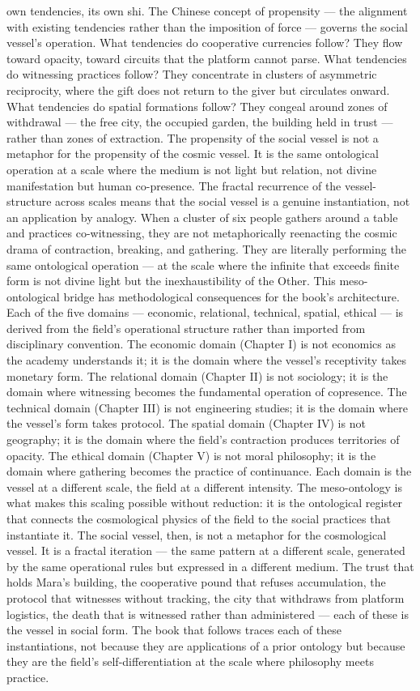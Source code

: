 own tendencies, its own shi. The Chinese concept of propensity — the alignment with existing tendencies rather than the imposition of force — governs the social vessel’s operation. What tendencies do cooperative currencies follow? They flow toward opacity, toward circuits that the platform cannot parse. What tendencies do witnessing practices follow? They concentrate in clusters of asymmetric reciprocity, where the gift does not return to the giver but circulates onward. What tendencies do spatial formations follow? They congeal around zones of withdrawal — the free city, the occupied garden, the building held in trust — rather than zones of extraction. The propensity of the social vessel is not a metaphor for the propensity of the cosmic vessel. It is the same ontological operation at a scale where the medium is not light but relation, not divine manifestation but human co-presence. The fractal recurrence of the vessel-structure across scales means that the social vessel is a genuine instantiation, not an application by analogy. When a cluster of six people gathers around a table and practices co-witnessing, they are not metaphorically reenacting the cosmic drama of contraction, breaking, and gathering. They are literally performing the same ontological operation — at the scale where the infinite that exceeds finite form is not divine light but the inexhaustibility of the Other. This meso-ontological bridge has methodological consequences for the book’s architecture. Each of the five domains — economic, relational, technical, spatial, ethical — is derived from the field’s operational structure rather than imported from disciplinary convention. The economic domain (Chapter I) is not economics as the academy understands it; it is the domain where the vessel’s receptivity takes monetary form. The relational domain (Chapter II) is not sociology; it is the domain where witnessing becomes the fundamental operation of copresence. The technical domain (Chapter III) is not engineering studies; it is the domain where the vessel’s form takes protocol. The spatial domain (Chapter IV) is not geography; it is the domain where the field’s contraction produces territories of opacity. The ethical domain (Chapter V) is not moral philosophy; it is the domain where gathering becomes the practice of continuance. Each domain is the vessel at a different scale, the field at a different intensity. The meso-ontology is what makes this scaling possible without reduction: it is the ontological register that connects the cosmological physics of the field to the social practices that instantiate it. The social vessel, then, is not a metaphor for the cosmological vessel. It is a fractal iteration — the same pattern at a different scale, generated by the same operational rules but expressed in a different medium. The trust that holds Mara’s building, the cooperative pound that refuses accumulation, the protocol that witnesses without tracking, the city that withdraws from platform logistics, the death that is witnessed rather than administered — each of these is the vessel in social form. The book that follows traces each of these instantiations, not because they are applications of a prior ontology but because they are the field’s self-differentiation at the scale where philosophy meets practice.

